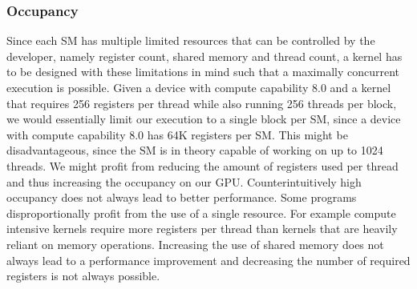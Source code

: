 \subsubsection{Occupancy}
Since each SM has multiple limited resources that can be controlled by the developer, namely register count, shared memory and thread count, a kernel has to be designed with these limitations in mind such that a maximally concurrent execution is possible.
Given a device with compute capability 8.0 and a kernel that requires 256 registers per thread while also running 256 threads per block, we would essentially limit our execution to a single block per SM, since a device with compute capability 8.0 has 64K registers per SM.
This might be disadvantageous, since the SM is in theory capable of working on up to 1024 threads.
We might profit from reducing the amount of registers used per thread and thus increasing the occupancy on our GPU.
Counterintuitively high occupancy does not always lead to better performance. Some programs disproportionally profit from the use of a single resource.
For example compute intensive kernels require more registers per thread than kernels that are heavily reliant on memory operations. Increasing the use of shared memory does not always lead to a performance improvement and decreasing the number of required registers is not always possible.
